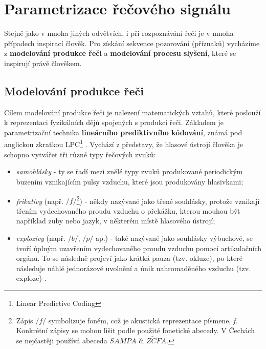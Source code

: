 \section{Parametrizace řečového signálu}
\label{chap:asr:parametrization}

Stejně jako v mnoha jiných odvětvích, i při rozpoznávání řeči je v mnoha případech inspirací člověk. Pro získání sekvence pozorování (příznaků) vycházíme z \textbf{modelování produkce řeči} a \textbf{modelování procesu slyšení}, které se inspirují právě člověkem.

\subsection{Modelování produkce řeči}
\label{chap:asr:parametrization:production}

Cílem modelování produkce řeči je nalezení matematických vztahů, které poslouží k reprezentaci fyzikálních dějů spojených s produkcí řeči. Základem je parametrizační technika \textbf{lineárního prediktivního kódování}, známá pod anglickou zkratkou LPC\footnote{Linear Predictive Coding} \cite{Benesty2007}. Vychází z představy, že hlasové ústrojí člověka je schopno vytvářet tři různé typy řečových zvuků:

\begin{itemize}
  \item \textit{samohlásky} - ty se řadí mezi znělé typy zvuků produkované periodickým buzením vznikajícím pulsy vzduchu, které jsou produkovány hlasivkami;
  \item \textit{frikativy} (např. $/f/$\footnote{Zápis $/f/$ symbolizuje foném, což je akustická reprezentace písmene, \textit{f}. Konkrétní zápisy se mohou lišit podle použité fonetické abecedy. V Čechách se nejčastěji používá abeceda $SAMPA$ či $Z\check{C}FA$.}) - někdy nazývané jako třené souhlásky, protože vznikají třením vydechovaného proudu vzduchu o překážku, kterou mouhou být například zuby nebo jazyk, v některém místě hlasového ústrojí;
  \item \textit{explozivy} (např. $/b/$, $/p/$ ap.) - také nazývané jako souhlásky výbuchové, se tvoří úplným uzavřením vydechovaného proudu vzduchu pomocí artikulačních orgánů. To se následně projeví jako krátká pauza (tzv. okluze), po které následuje náhlé jednorázové uvolnění a únik nahromaděného vzduchu (tzv. exploze) \cite{Psutka2006}.
\end{itemize}

